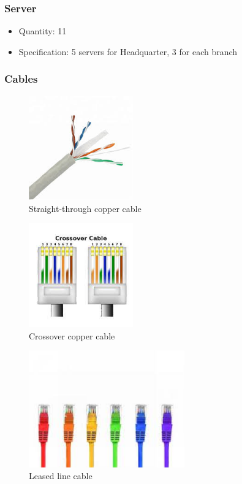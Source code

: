 \subsubsection{Server}
\begin{itemize}
  \item Quantity: 11
  \item Specification: 5 servers for Headquarter, 3 for each branch
\end{itemize}

\subsubsection{Cables}
\begin{figure}[H]
  \centering
  \includegraphics[width=0.4\textwidth]{./assets/copper.png}
  \caption{Straight-through copper cable}
\end{figure}

\begin{figure}[H]
  \centering
  \includegraphics[width=0.4\textwidth]{./assets/crossover.png}
  \caption{Crossover copper cable}
\end{figure}

\begin{figure}[H]
  \centering
  \includegraphics[width=0.6\textwidth]{./assets/lease.png}
  \caption{Leased line cable}
\end{figure}

